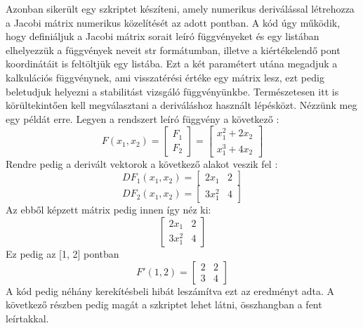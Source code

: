 \documentclass{article}
\theoremstyle{definition}
\theoremstyle{theorem}
\begin{document}
Azonban sikerült egy szkriptet készíteni, amely numerikus deriválással létrehozza a Jacobi mátrix numerikus közelítését az adott pontban. A kód úgy működik, hogy definiáljuk a Jacobi mátrix sorait leíró függvényeket és egy listában elhelyezzük a függvények neveit str formátumban, illetve a kiértékelendő pont koordinátáit is feltöltjük egy listába. Ezt a két paramétert utána megadjuk a kalkulációs függvénynek, ami visszatérési értéke egy mátrix lesz, ezt pedig beletudjuk helyezni a stabilitást vizsgáló függvényünkbe. Természetesen itt is körültekintően kell megválasztani a deriváláshoz használt lépésközt.\newline
Nézzünk meg egy példát erre. Legyen a rendszert leíró függvény a következő :
\begin{equation*}
    F(x_1,x_2) =
        \begin{bmatrix}
            F_1 \\
            F_2
        \end{bmatrix}
        = \begin{bmatrix}
            x_1 ^2 + 2 x_2 \\
            x_1 ^3 + 4 x_2
        \end{bmatrix}
\end{equation*}
Rendre pedig a derivált vektorok a következő alakot veszik fel :
\begin{equation*}
    D F_1(x_1,x_2) = \begin{bmatrix}
        2 x_1 & 2
    \end{bmatrix}
\end{equation*}
\begin{equation*}
    D F_2 (x_1,x_2) = \begin{bmatrix}
        3 x_1^2 & 4
    \end{bmatrix}
\end{equation*}
Az ebből képzett mátrix pedig innen így néz ki:
\begin{equation*}
    \begin{bmatrix}
        2 x_1 & 2 \\
        3 x_1^2 & 4
    \end{bmatrix}
\end{equation*}
Ez pedig az [1, 2] pontban
\begin{equation*}
F'(1,2) =
    \begin{bmatrix}
        2 & 2 \\
        3 & 4
    \end{bmatrix}
\end{equation*}
A kód pedig néhány kerekítésbeli hibát leszámítva ezt az eredményt adta. A következő részben pedig magát a szkriptet lehet látni, összhangban a fent leírtakkal.
\end{document}
